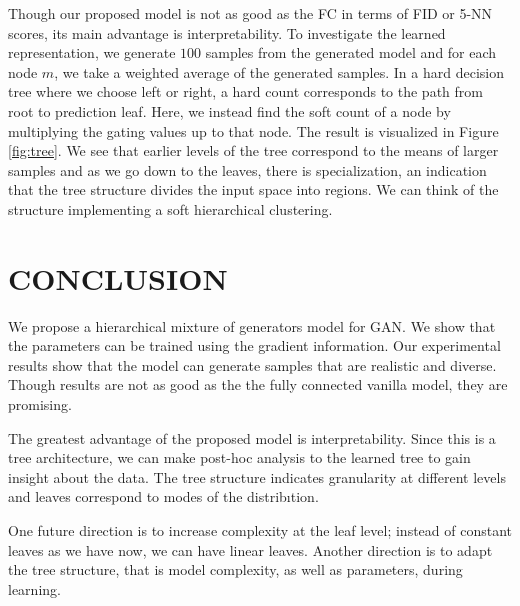 \documentclass[a4paper,onesided,12pt]{report}
\begin{document}
Though our proposed model is not as good as the FC in terms of FID or 5-NN scores, its main advantage is interpretability. To investigate the learned representation, we generate $100$ samples from the generated model and for each node $m$, we take a weighted average of the generated samples. In a hard decision tree where we choose left or right, a hard count corresponds to the path from root to prediction leaf. Here, we instead find the soft count of a node by multiplying the gating values up to that node. The result is visualized in Figure \ref{fig:tree}. We see that earlier levels of the tree correspond to the means of larger samples and as we go down to the leaves, there is specialization, an indication that the tree structure divides the input space into regions. We can think of the structure implementing a soft hierarchical clustering. 

\chapter{CONCLUSION}
\label{chapter:conc}
We propose a hierarchical mixture of generators model for GAN. We show that the parameters can be trained using the gradient information. Our experimental results show that the model can generate samples that are realistic and diverse. Though results are not as good as the the fully connected vanilla model, they are promising.

The greatest advantage of the proposed model is interpretability. Since this is a tree architecture, we can make post-hoc analysis to the learned tree to gain insight about the data. The tree structure indicates granularity at different levels and leaves correspond to modes of the distribıtion.

One future direction is to increase complexity at the leaf level; instead of constant leaves as we have now, we can have linear leaves. Another direction is to adapt the tree structure, that is model complexity, as well as parameters, during learning.



\end{document}
